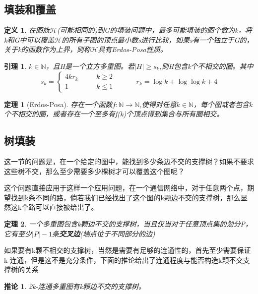 \documentclass[UTF8]{ctexart}
\newtheorem{dfnt}{定义}
\newtheorem{thr}{定理}
\newtheorem{lemma}{引理}
\newtheorem*{coro}{推论}
\begin{document}
\subsection{填装和覆盖}
\begin{dfnt}
在图族$\mathscr{H}$(可能相同的)到G的填装问题中，最多可能填装的图个数为k，将k和G中可以覆盖$\mathscr{H}$的所有子图的顶点最小数s进行比较，如果s有一个独立于G的，关于k的函数作为上界，则称$\mathscr{H}$具有Erdos-Posa性质。
\end{dfnt}
\begin{lemma}
$k \in \mathbb{N}$，且H是一个立方多重图。若$|H| \geq s_k$,则H包含k个不相交的圈。其中$$s_k=\left \{
\begin{aligned}
4kr_k &\quad& k \geq 2 \\
1 &\quad&k \leq 1
\end{aligned}
\right.
\quad \quad \quad r_k = \log k+\log \log k +4
$$
\end{lemma}
\begin{thr}[Erdos-Posa]
存在一个函数$f:\mathbb{N}\rightarrow \mathbb{N}$,使得对任意$k \in \mathbb{N}$，每个图或者包含k个不相交的圈，或者存在一个至多有f(k)个顶点得到集合与所有圈相交。
\end{thr}
\subsection{树填装}
这一节的问题是，在一个给定的图中，能找到多少条边不交的支撑树？如果不要求这些树不交，那么至少需要多少棵树才可以覆盖这个图呢？

这个问题直接应用于这样一个应用问题，在一个通信网络中，对于任意两个点，期望找到k条不同的路，倘若我们已经找出了这个图的k颗边不交的支撑树，那么显然这k个路可以直接被给出了。
\begin{thr}
一个多重图包含k颗边不交的支撑树，当且仅当对于任意顶点集的划分P，它有至少$|P|-1$条\textbf{交叉边}(端点位于不同部分的边)
\end{thr}
如果要有k颗不相交的支撑树，当然是需要有足够的连通性的，首先至少需要保证k-连通，但是这不是充分条件，下面的推论给出了连通程度与能否构造k颗不交支撑树的关系
\begin{coro}
2k-连通多重图有k颗边不交的支撑树。
\end{coro}
\end{document}
